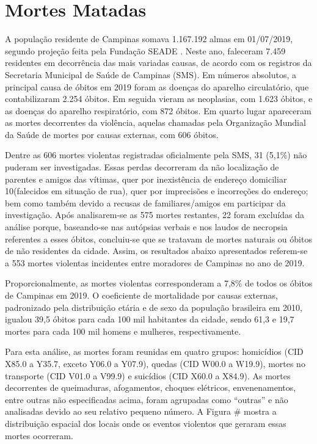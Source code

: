 \chapter{Mortes Matadas}

A população residente de Campinas somava 1.167.192 almas em 01/07/2019, segundo projeção feita pela Fundação SEADE \citep{SEADE2020}. Neste ano, faleceram 7.459 residentes em decorrência das mais variadas causas, de acordo com os registros da Secretaria Municipal de Saúde de Campinas (SMS)\citep{SMS2020}. Em números absolutos, a principal causa de óbitos em 2019 foram as doenças do aparelho circulatório, que contabilizaram 2.254 óbitos. Em seguida vieram as neoplasias, com 1.623 óbitos, e as doenças do aparelho respiratório, com 872 óbitos. Em quarto lugar apareceram as mortes decorrentes da violência, aquelas chamadas pela Organização Mundial da Saúde de mortes por causas externas, com 606 óbitos.

Dentre as 606 mortes violentas registradas oficialmente pela SMS, 31 (5,1\%) não puderam ser investigadas. Essas perdas decorreram da não localização de parentes e amigos das vítimas, quer por inexistência de endereço domiciliar 10(falecidos em situação de rua), quer por imprecisões e incorreções do endereço; bem como também devido a recusas de familiares/amigos em participar da investigação. Após analisarem-se as 575 mortes restantes, 22 foram excluídas da análise porque, baseando-se nas autópsias verbais e nos laudos de necropsia referentes a esses óbitos, concluiu-se que se tratavam de mortes naturais ou óbitos de não residentes da cidade. Assim, os resultados abaixo apresentados referem-se a 553 mortes violentas incidentes entre moradores de Campinas no ano de 2019.

Proporcionalmente, as mortes violentas corresponderam a 7,8\% de todos os óbitos de Campinas em 2019. O coeficiente de mortalidade por causas externas, padronizado pela distribuição etária e de sexo da população brasileira em 2010, igualou 39,5 óbitos para cada 100 mil habitantes da cidade, sendo 61,3 e 19,7 mortes para cada 100 mil homens e mulheres, respectivamente.

Para esta análise, as mortes foram reunidas em quatro grupos: homicídios (CID X85.0 a Y35.7, exceto Y06.0 a Y07.9), quedas (CID W00.0 a W19.9), mortes no transporte (CID V01.0 a V99.9) e suicídios (CID X60.0 a X84.9). As mortes decorrentes de queimaduras, afogamentos, choques elétricos, envenenamentos, entre outras não especificadas acima, foram agrupadas como “outras” e não analisadas devido ao seu relativo pequeno número. A Figura \# mostra a distribuição espacial dos locais onde os eventos violentos que geraram essas mortes ocorreram.

